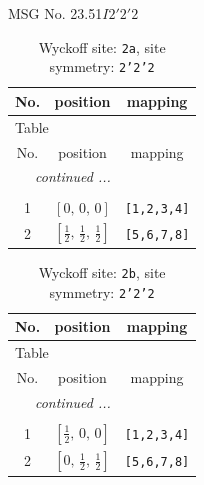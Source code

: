 \documentclass[fleqn,8pt]{jsarticle}
\begin{document}
\setcounter{MaxMatrixCols}{32}

\renewcommand{\tablename}{Table~}
\renewcommand{\figurename}{Figure~}
\begin{center}
\LARGE
MSG No. 23.51\quad$I2'2'2$
\end{center}
\renewcommand{\arraystretch}{1.2}
\begin{longtable}{ccc}
\caption{Wyckoff site: {\tt 2a}, site symmetry: {\tt 2'2'2}}
 \\
 \hline \hline
No. & position & mapping \\ \hline \endfirsthead

\multicolumn{2}{l}{\tablename\ \thetable{}} \\
 \hline \hline
No. & position & mapping \\ \hline \endhead

 \hline \hline
\multicolumn{2}{r}{\footnotesize\it continued ...} \\ \endfoot

 \hline \hline
\multicolumn{2}{r}{} \\ \endlastfoot

1 & $\left[ 0,\, 0,\, 0 \right]$ & {\tt [1,2,3,4]} \\ \hline
2 & $\left[ \frac{1}{2},\, \frac{1}{2},\, \frac{1}{2} \right]$ & {\tt [5,6,7,8]} \\
\end{longtable}
\renewcommand{\arraystretch}{1.2}
\begin{longtable}{ccc}
\caption{Wyckoff site: {\tt 2b}, site symmetry: {\tt 2'2'2}}
 \\
 \hline \hline
No. & position & mapping \\ \hline \endfirsthead

\multicolumn{2}{l}{\tablename\ \thetable{}} \\
 \hline \hline
No. & position & mapping \\ \hline \endhead

 \hline \hline
\multicolumn{2}{r}{\footnotesize\it continued ...} \\ \endfoot

 \hline \hline
\multicolumn{2}{r}{} \\ \endlastfoot

1 & $\left[ \frac{1}{2},\, 0,\, 0 \right]$ & {\tt [1,2,3,4]} \\ \hline
2 & $\left[ 0,\, \frac{1}{2},\, \frac{1}{2} \right]$ & {\tt [5,6,7,8]} \\
\end{longtable}
\end{document}
